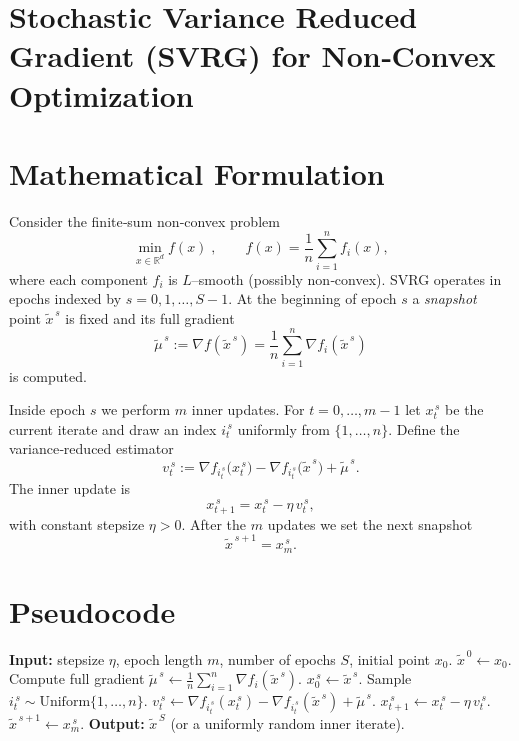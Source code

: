 \documentclass{article}
\newcommand{\R}{\mathbb{R}}
\begin{document}
\section*{Stochastic Variance Reduced Gradient (SVRG) for Non‑Convex Optimization}

\section*{Mathematical Formulation}
Consider the finite‑sum non‑convex problem
\[
\min_{x\in\R^{d}} f(x)\;,\qquad 
f(x)=\frac{1}{n}\sum_{i=1}^{n} f_i(x),
\]
where each component $f_i$ is $L$–smooth (possibly non‑convex).  
SVRG operates in epochs indexed by $s=0,1,\dots,S-1$.  
At the beginning of epoch $s$ a \emph{snapshot} point $\tilde{x}^{\,s}$ is fixed and its full gradient
\[
\tilde{\mu}^{\,s}:=\nabla f(\tilde{x}^{\,s})=\frac{1}{n}\sum_{i=1}^{n}\nabla f_i(\tilde{x}^{\,s})
\]
is computed.  

Inside epoch $s$ we perform $m$ inner updates.  For $t=0,\dots,m-1$ let $x_t^{\,s}$ be the current iterate and draw an index $i_t^{\,s}$ uniformly from $\{1,\dots,n\}$.  Define the variance‑reduced estimator
\[
v_t^{\,s}:=\nabla f_{i_t^{\,s}}\!\bigl(x_t^{\,s}\bigr)-\nabla f_{i_t^{\,s}}\!\bigl(\tilde{x}^{\,s}\bigr)+\tilde{\mu}^{\,s}.
\]
The inner update is
\[
x_{t+1}^{\,s}=x_t^{\,s}-\eta\,v_t^{\,s},
\]
with constant stepsize $\eta>0$.  After the $m$ updates we set the next snapshot
\[
\tilde{x}^{\,s+1}=x_{m}^{\,s}.
\]

\section*{Pseudocode}
\begin{algorithm}[H]
\caption{SVRG (non‑convex)}\label{alg:svrg}
\begin{algorithmic}[1]
\STATE \textbf{Input:} stepsize $\eta$, epoch length $m$, number of epochs $S$, initial point $x_0$.
\STATE $\tilde{x}^{\,0}\gets x_0$.
    \STATE Compute full gradient $\tilde{\mu}^{\,s}\gets \frac{1}{n}\sum_{i=1}^{n}\nabla f_i(\tilde{x}^{\,s})$.
    \STATE $x_0^{\,s}\gets \tilde{x}^{\,s}$.
        \STATE Sample $i_t^{\,s}\sim\text{Uniform}\{1,\dots,n\}$.
        \STATE $v_t^{\,s}\gets \nabla f_{i_t^{\,s}}(x_t^{\,s})-\nabla f_{i_t^{\,s}}(\tilde{x}^{\,s})+\tilde{\mu}^{\,s}$.
        \STATE $x_{t+1}^{\,s}\gets x_t^{\,s}-\eta\,v_t^{\,s}$.
    \ENDFOR
    \STATE $\tilde{x}^{\,s+1}\gets x_{m}^{\,s}$.
\ENDFOR
\STATE \textbf{Output:} $\tilde{x}^{\,S}$ (or a uniformly random inner iterate).
\end{algorithmic}
\end{algorithm}
\end{document}
